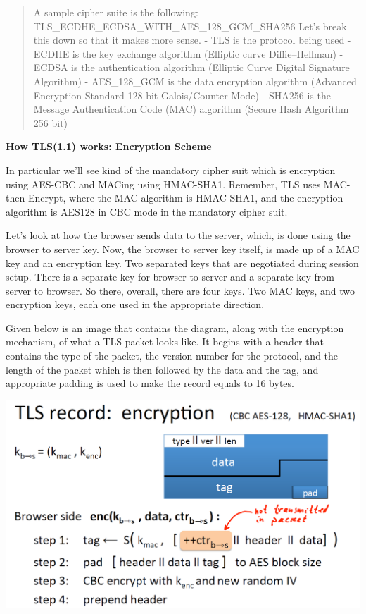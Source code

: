 \documentclass[11pt]{article}
\makeatletter
\def\maxwidth{\ifdim\Gin@nat@width>\linewidth\linewidth
    \else\Gin@nat@width\fi}
\let\Oldincludegraphics\includegraphics
\renewcommand{\includegraphics}[1]{\Oldincludegraphics[width=.8\maxwidth]{#1}}
\makeatother
\begin{document}
\begin{quote}
A sample cipher suite is the following:
TLS\_ECDHE\_ECDSA\_WITH\_AES\_128\_GCM\_SHA256 Let's break this down so
that it makes more sense. - TLS is the protocol being used - ECDHE is
the key exchange algorithm (Elliptic curve Diffie--Hellman) - ECDSA is
the authentication algorithm (Elliptic Curve Digital Signature
Algorithm) - AES\_128\_GCM is the data encryption algorithm (Advanced
Encryption Standard 128 bit Galois/Counter Mode) - SHA256 is the Message
Authentication Code (MAC) algorithm (Secure Hash Algorithm 256 bit)
\end{quote}

\textbf{How TLS(1.1) works: Encryption Scheme}

In particular we'll see kind of the mandatory cipher suit which is
encryption using AES-CBC and MACing using HMAC-SHA1. Remember, TLS uses
MAC-then-Encrypt, where the MAC algorithm is HMAC-SHA1, and the
encryption algorithm is AES128 in CBC mode in the mandatory cipher suit.

Let's look at how the browser sends data to the server, which, is done
using the browser to server key. Now, the browser to server key itself,
is made up of a MAC key and an encryption key. Two separated keys that
are negotiated during session setup. There is a separate key for browser
to server and a separate key from server to browser. So there, overall,
there are four keys. Two MAC keys, and two encryption keys, each one
used in the appropriate direction.

Given below is an image that contains the diagram, along with the
encryption mechanism, of what a TLS packet looks like. It begins with a
header that contains the type of the packet, the version number for the
protocol, and the length of the packet which is then followed by the
data and the tag, and appropriate padding is used to make the record
equals to 16 bytes.

\includegraphics{./Images/TLSEnc.png}
\end{document}
